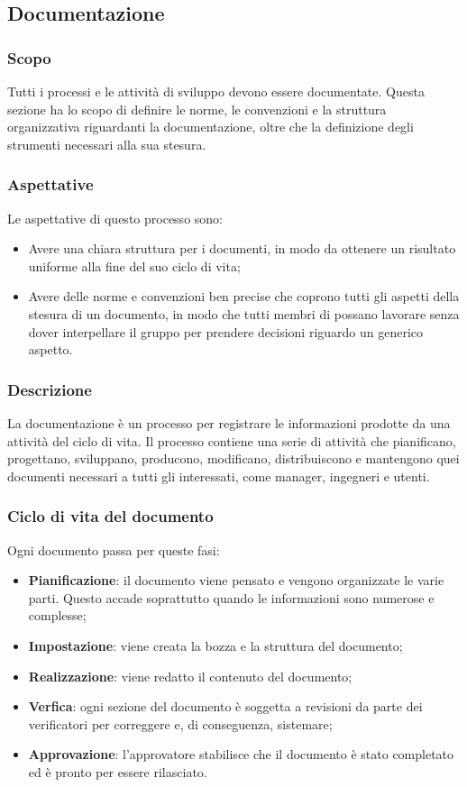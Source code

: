 \subsection{Documentazione}
\subsubsection{Scopo}
Tutti i processi e le attività di sviluppo devono essere documentate. Questa sezione ha lo scopo di definire le norme, le convenzioni e la struttura organizzativa riguardanti la documentazione, oltre che la definizione degli strumenti necessari alla sua stesura.
\subsubsection{Aspettative}
Le aspettative di questo processo sono:
\begin{itemize}
	\item Avere una chiara struttura per i documenti, in modo da ottenere un risultato uniforme alla fine del suo ciclo di vita;	
	\item Avere delle norme e convenzioni ben precise che coprono tutti gli aspetti della stesura di un documento, in modo che tutti membri di \Gruppo{} possano lavorare senza dover interpellare il gruppo per prendere decisioni riguardo un generico aspetto.
\end{itemize}
\subsubsection{Descrizione}
La documentazione è un processo per registrare le informazioni prodotte da una attività del ciclo di vita. Il processo contiene una serie di attività che pianificano, progettano, sviluppano, producono, modificano, distribuiscono e mantengono quei documenti necessari a tutti gli interessati, come manager, ingegneri e utenti.
\subsubsection{Ciclo di vita del documento}
Ogni documento passa per queste fasi:
\begin{itemize}

	\item \textbf{Pianificazione}: il documento viene pensato e vengono organizzate le varie parti. Questo accade soprattutto quando le informazioni sono numerose e complesse;
	
	\item \textbf{Impostazione}: viene creata la bozza e la struttura del documento;
	
	\item \textbf{Realizzazione}: viene redatto il contenuto del documento;
	
	\item \textbf{Verfica}: ogni sezione del documento è soggetta a revisioni da parte dei verificatori per correggere e, di conseguenza, sistemare;
	
	\item \textbf{Approvazione}: l'approvatore stabilisce che il documento è stato completato ed è pronto per essere rilasciato.
	
\end{itemize}
